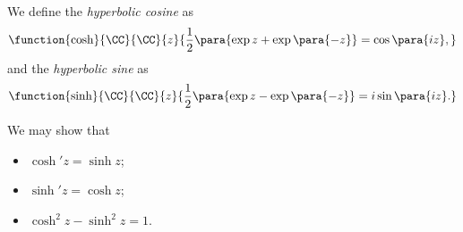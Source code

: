 \begin{definition}
    We define the \emph{hyperbolic cosine} as
    \[
        \function{\cosh}{\CC}{\CC}{z}{\frac{1}{2} \para{\exp z + \exp \para{-z}} = \cos \para{iz},}
    \]
    and the \emph{hyperbolic sine} as 
    \[
        \function{\sinh}{\CC}{\CC}{z}{\frac{1}{2} \para{\exp z - \exp \para{-z}} = i \sin \para{iz}.}
    \]
\end{definition}

We may show that
\begin{itemize}
    \item \(\cosh' z = \sinh z\);
    \item \(\sinh' z = \cosh z\);
    \item \(\cosh^2 z - \sinh^2 z = 1\).
\end{itemize}